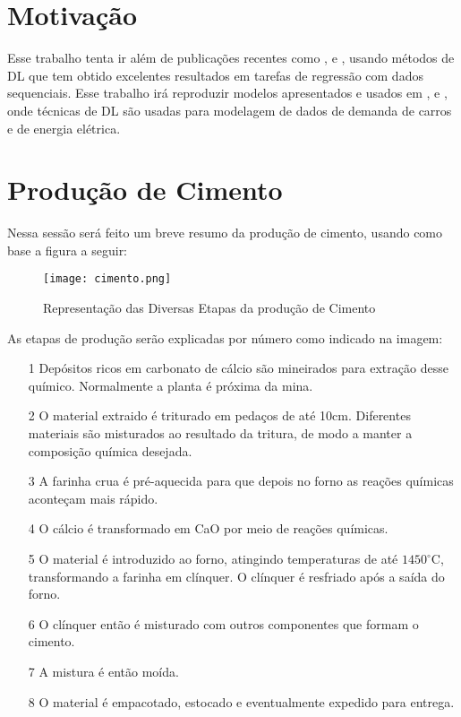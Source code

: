 \section {Motivação}

Esse trabalho tenta ir além de publicações recentes como \citet{cementnn1},
\citet{cementnn2} e \citet{cementml}, usando métodos de DL que tem
obtido excelentes resultados em tarefas de
regressão com dados sequenciais. Esse trabalho irá reproduzir modelos
apresentados e usados em \cite{ubertime}, \cite{lstmbr} e \cite{energylstm}, onde
técnicas de DL são usadas para modelagem de dados de demanda de carros e de energia elétrica. 

\section{Produção de Cimento}
\label{sec:producao}

Nessa sessão será feito um breve resumo da produção de cimento, usando como base a figura a seguir: \\ 

\begin{figure}[H]
\centering
\texttt{[image: cimento.png]}
\caption{Representação das Diversas Etapas da produção de Cimento \citep{cementroadmap}}
\end{figure}


As etapas de produção serão explicadas por número como indicado na imagem: \\

\begin{itemize}

\item[1] Depósitos ricos em carbonato de cálcio são mineirados para extração desse químico. Normalmente a planta é próxima da mina.
\item[2] O material extraido é triturado em pedaços de até 10cm. Diferentes materiais são misturados ao resultado da tritura, de modo a manter a composição química desejada. 
\item[3] A farinha crua é pré-aquecida para que depois no forno as reações químicas aconteçam mais rápido. 
\item[4] O cálcio é transformado em CaO por meio de reações químicas.  
\item[5] O material é introduzido ao forno, atingindo temperaturas de até $1450^\circ$C, transformando a farinha em clínquer. O clínquer é resfriado após a saída do forno. 
\item[6] O clínquer então é misturado com outros componentes que formam o cimento.
\item[7] A mistura é então moída.
\item[8] O material é empacotado, estocado e eventualmente expedido para entrega.

\end{itemize}

